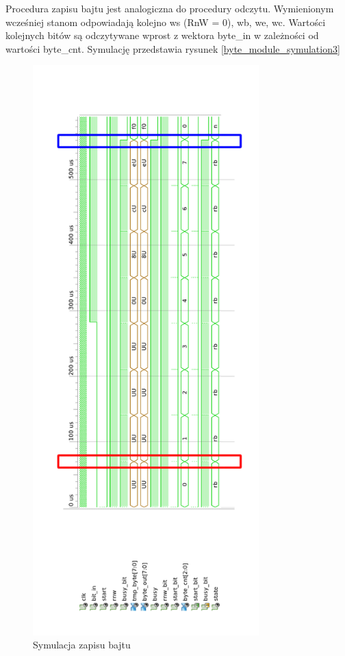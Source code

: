 \documentclass[a4paper]{article}
\begin{document}
Procedura zapisu bajtu jest analogiczna do procedury odczytu. Wymienionym wcześniej stanom odpowiadają kolejno ws (RnW = 0), wb, we, wc. Wartości kolejnych bitów są odczytywane wprost z wektora byte\_in w zależności od wartości byte\_cnt.  Symulację przedstawia rysunek \ref{byte_module_symulation3}

\begin{figure}[H]
\begin{center}
\includegraphics[height=22cm]{graphics/byte_module_symulation1.png}
\end{center}
\caption{Symulacja zapisu bajtu}
\label{byte_module_symulation1}
\end{figure}
\end{document}
